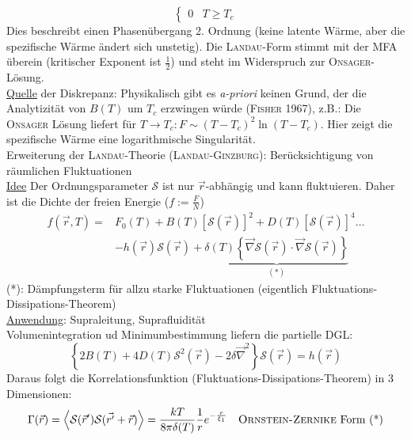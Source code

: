 \begin{enumerate}[A)]
\begin{equation}
\begin{cases}
            0 & T \geq T_c
        \end{cases}
    \end{equation}
    Dies beschreibt einen Phasenübergang 2. Ordnung (keine latente Wärme, aber die spezifische Wärme ändert sich unstetig).
    Die \textsc{Landau}-Form stimmt mit der MFA  überein (kritischer Exponent ist $\frac{1}{2}$) und steht im Widerspruch zur \textsc{Onsager}-Lösung. \\
    \underline{Quelle} der Diskrepanz: Physikalisch gibt es \emph{a-priori} keinen Grund, der die Analytizität von $B(T)$ um $T_c$ erzwingen würde (\textsc{Fisher} 1967),
    z.B.: Die \textsc{Onsager} Lösung liefert für $T \to T_c: F \sim (T-T_c)^2 \ln (T-T_c)$. Hier zeigt die spezifische Wärme eine logarithmische
    Singularität. \\[\baselineskip]
    Erweiterung der \textsc{Landau}-Theorie (\textsc{Landau-Ginzburg}): Berücksichtigung von räumlichen Fluktuationen \\
    \underline{Idee} Der Ordnungsparameter $\mathcal{S}$ ist nur $\vec{r}$-abhängig und kann fluktuieren. Daher ist die Dichte  der freien Energie ($f := \frac{F}{N}$)
    \begin{equation}
        \begin{split}
            f(\vec{r}, T) =& F_0(T) + B(T) \left[ \mathcal{S}(\vec{r}) \right]^2 + D(T) \left[ \mathcal{S}(\vec{r}) \right]^4 \ldots \\
            &- h(\vec{r}) \mathcal{S}(\vec{r}) + \underbrace{\delta(T) \left\{ \vec{\nabla} \mathcal{S}(\vec{r}) \cdot \vec{\nabla} \mathcal{S}(\vec{r}) \right\}}_{(*)}
        \end{split}
    \end{equation}
    (*): Dämpfungsterm für allzu starke Fluktuationen (eigentlich Fluktuations-Dis\-si\-pa\-tions-Theorem) \\
    \underline{Anwendung}: Supraleitung, Suprafluidität \\
    Volumenintegration ud Minimumbestimmung liefern die partielle DGL:
    \begin{equation}
        \left\{ 2 B(T) + 4D(T) \mathcal{S}^2 (\vec{r}) - 2 \delta \vec{\nabla}^2 \right\} \mathcal{S}(\vec{r}) = h(\vec{r})
    \end{equation}
    Daraus folgt die Korrelationsfunktion (Fluktuations-Dissipations-Theorem) in 3 Dimensionen:
    \begin{equation}
        \begin{split}
            \Gamma(\vec{r}) &= \avg{\mathcal{S}(\vec{r}') \mathcal{S} (\vec{r'}+\vec{r})} = \frac{k T}{8 \pi \delta (T)} \frac{1}{r} e^{-\frac{r}{\xi_1}} \quad \text{\textsc{Ornstein-Zernike} Form (*)} \\

\end{split}
\end{equation}
\end{enumerate}
